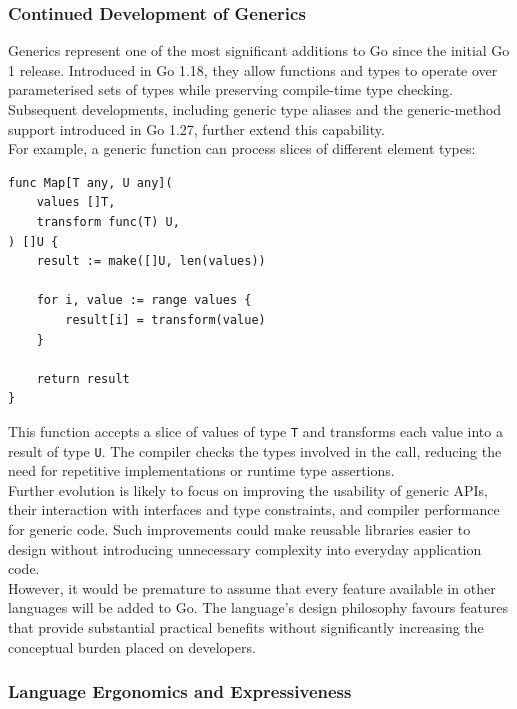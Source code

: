 \subsubsection{Continued Development of Generics}

Generics represent one of the most significant additions to Go since the initial Go 1 release. Introduced in Go 1.18, they allow functions and types to operate over parameterised sets of types while preserving compile-time type checking.\\

Subsequent developments, including generic type aliases and the generic-method support introduced in Go 1.27, further extend this capability.\\

For example, a generic function can process slices of different element types:

\begin{lstlisting}
func Map[T any, U any](
    values []T,
    transform func(T) U,
) []U {
    result := make([]U, len(values))

    for i, value := range values {
        result[i] = transform(value)
    }

    return result
}
\end{lstlisting}

This function accepts a slice of values of type \texttt{T} and transforms each value into a result of type \texttt{U}. The compiler checks the types involved in the call, reducing the need for repetitive implementations or runtime type assertions.\\

Further evolution is likely to focus on improving the usability of generic APIs, their interaction with interfaces and type constraints, and compiler performance for generic code. Such improvements could make reusable libraries easier to design without introducing unnecessary complexity into everyday application code.\\

However, it would be premature to assume that every feature available in other languages will be added to Go. The language's design philosophy favours features that provide substantial practical benefits without significantly increasing the conceptual burden placed on developers.

\subsubsection{Language Ergonomics and Expressiveness}

